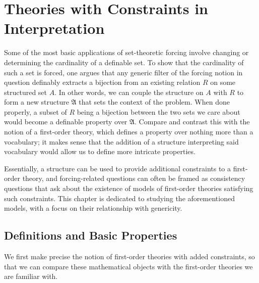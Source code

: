 \documentclass[12pt, twoside]{memoir}
\numberwithin{equation}{section}
\theoremstyle{definition}
\theoremstyle{remark}
\theoremstyle{definition}
\theoremstyle{definition}
\theoremstyle{definition}
\theoremstyle{remark}
\begin{document}
\chapter{Theories with Constraints in Interpretation}\label{TCIsec}

Some of the most basic applications of set-theoretic forcing involve changing or determining the cardinality of a definable set. To show that the cardinality of such a set is forced, one argues that any generic filter of the forcing notion in question definably extracts a bijection from an existing relation $R$ on some structured set $A$. In other words, we can couple the structure on $A$ with $R$ to form a new structure $\mathfrak{A}$ that sets the context of the problem. When done properly, a subset of $R$ being a bijection between the two sets we care about would become a definable property over $\mathfrak{A}$. Compare and contrast this with the notion of a first-order theory, which defines a property over nothing more than a vocabulary; it makes sense that the addition of a structure interpreting said vocabulary would allow us to define more intricate properties. 

Essentially, a structure can be used to provide additional constraints to a first-order theory, and forcing-related questions can often be framed as consistency questions that ask about the existence of models of first-order theories satisfying such constraints. This chapter is dedicated to studying the aforementioned models, with a focus on their relationship with genericity.

\section{Definitions and Basic Properties}\label{subs51}

We first make precise the notion of first-order theories with added constraints, so that we can compare these mathematical objects with the first-order theories we are familiar with. 
\end{document}
